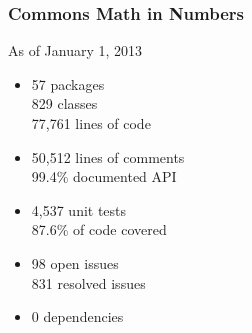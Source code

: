 \begin{frame}[fragile]
  \frametitle{Commons Math in Numbers}

As of January 1, 2013

\begin{itemize}
\item 57 packages\\
  829 classes\\
  77,761 lines of code\\
\item 50,512 lines of comments\\
  99.4\% documented API\\
\item 4,537 unit tests\\
  87.6\% of code covered\\
\item 98 open issues\\
  831 resolved issues\\
\item 0 dependencies\\
\end{itemize}


\end{frame}
